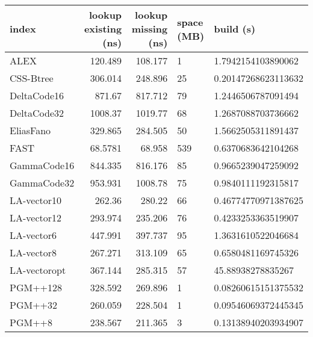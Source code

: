 \begin{tabular}{lrrll}
\hline
 index             &   lookup existing (ns) &   lookup missing (ns) & space (MB)   & build (s)             \\
\hline
 ALEX              &               120.489  &              108.177  & 1            & 1.7942154103890062    \\
 CSS-Btree         &               306.014  &              248.896  & 25           & 0.20147268623113632   \\
 DeltaCode16       &               871.67   &              817.712  & 79           & 1.2446506787091494    \\
 DeltaCode32       &              1008.37   &             1019.77   & 68           & 1.2687088703736662    \\
 EliasFano         &               329.865  &              284.505  & 50           & 1.5662505311891437    \\
 FAST              &                68.5781 &               68.958  & 539          & 0.6370683642104268    \\
 GammaCode16       &               844.335  &              816.176  & 85           & 0.9665239047259092    \\
 GammaCode32       &               953.931  &             1008.78   & 75           & 0.9840111192315817    \\
 LA-vector10       &               262.36   &              280.22   & 66           & 0.46774770971387625   \\
 LA-vector12       &               293.974  &              235.206  & 76           & 0.4233253363519907    \\
 LA-vector6        &               447.991  &              397.737  & 95           & 1.3631610522046684    \\
 LA-vector8        &               267.271  &              313.109  & 65           & 0.6580481169745326    \\
 LA-vectoropt      &               367.144  &              285.315  & 57           & 45.88938278835267     \\
 PGM++128          &               328.592  &              269.896  & 1            & 0.08260615151375532   \\
 PGM++32           &               260.059  &              228.504  & 1            & 0.09546069372445345   \\
 PGM++8            &               238.567  &              211.365  & 3            & 0.13138940203934907   \\

\end{tabular}
